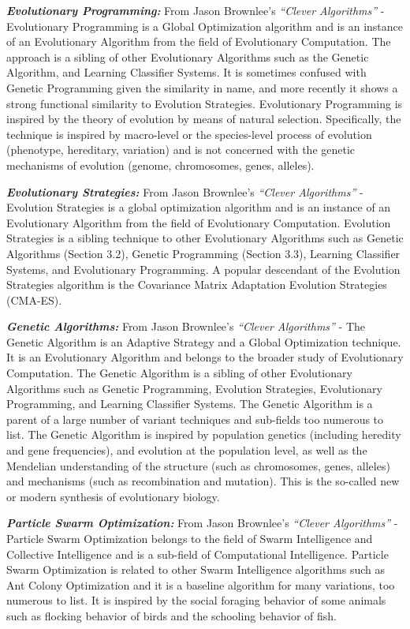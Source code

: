 \documentclass[conference]{IEEEtran}
\begin{document}
\textit{\textbf{Evolutionary Programming:}} From Jason Brownlee's \textit{``Clever Algorithms''} -
Evolutionary Programming is a Global Optimization algorithm and is an instance of an Evolutionary
Algorithm from the field of Evolutionary Computation. The approach is a sibling of other Evolutionary
Algorithms such as the Genetic Algorithm, and Learning Classifier Systems. It is sometimes confused with Genetic
Programming given the similarity in name, and more recently it shows a strong functional similarity to Evolution Strategies.
Evolutionary Programming is inspired by the theory of evolution by means of natural selection. Specifically, the technique is inspired by
macro-level or the species-level process of evolution (phenotype, hereditary, variation) and is not concerned with the genetic mechanisms of
evolution (genome, chromosomes, genes, alleles).

\textit{\textbf{Evolutionary Strategies:}} From Jason Brownlee's \textit{``Clever Algorithms''} -
Evolution Strategies is a global optimization algorithm and is an instance of an Evolutionary Algorithm from the field of Evolutionary
Computation. Evolution Strategies is a sibling technique to other Evolutionary Algorithms such as Genetic Algorithms (Section 3.2), Genetic
Programming (Section 3.3), Learning Classifier Systems, and Evolutionary Programming. A popular descendant of
the Evolution Strategies algorithm is the Covariance Matrix Adaptation Evolution Strategies (CMA-ES).

\textit{\textbf{Genetic Algorithms:}} From Jason Brownlee's \textit{``Clever Algorithms''} -
The Genetic Algorithm is an Adaptive Strategy and a Global Optimization technique. It is an Evolutionary Algorithm and belongs to the
broader study of Evolutionary Computation. The Genetic Algorithm is a sibling of other Evolutionary Algorithms such as Genetic Programming,
 Evolution Strategies, Evolutionary Programming, and Learning Classifier Systems. The Genetic Algorithm is a parent of a large number of variant techniques
and sub-fields too numerous to list. The Genetic Algorithm is inspired by population genetics (including heredity and gene frequencies),
and evolution at the population level, as well as the Mendelian understanding of the structure (such as chromosomes, genes, alleles) and mechanisms
(such as recombination and mutation). This is the so-called new or modern synthesis of evolutionary biology.

\textit{\textbf{Particle Swarm Optimization:}} From Jason Brownlee's \textit{``Clever Algorithms''} - Particle Swarm Optimization belongs to the field of
Swarm Intelligence and Collective Intelligence and is a sub-field of Computational Intelligence. Particle Swarm Optimization is related to other Swarm Intelligence
algorithms such as Ant Colony Optimization and it is a baseline algorithm for many variations, too numerous to list. It is inspired by the social foraging behavior
of some animals such as flocking behavior of birds and the schooling behavior of fish.
\end{document}
